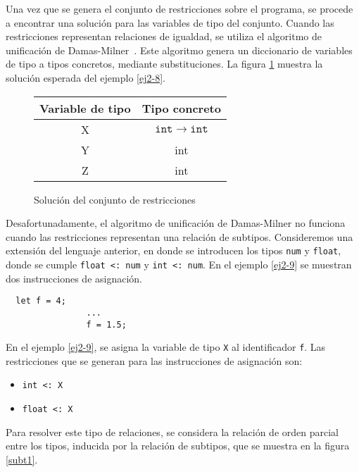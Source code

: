 Una vez que se genera el conjunto de restricciones sobre el programa, se procede a encontrar una solución para las variables de tipo del conjunto. Cuando las restricciones representan relaciones de igualdad, se utiliza el algoritmo de unificación de Damas-Milner~\cite{damasmilner}. Este algoritmo genera un diccionario de variables de tipo a tipos concretos, mediante substituciones. La figura \ref{tabla2} muestra la solución esperada del ejemplo \ref{ej2-8}.

\begin{figure}[ht]
  \centering
  \ttfamily
  \begin{tabular}{c c}
    Variable de tipo & Tipo concreto \\
    \hline
    X & $\mathtt{int \rightarrow int}$  \\
    Y & int \\
    Z & int \\
  \end{tabular}
  \caption{Solución del conjunto de restricciones}
  \label{tabla2}
\end{figure}

\clearpage
Desafortunadamente, el algoritmo de unificación de Damas-Milner no funciona cuando las restricciones representan una relación de subtipos. Consideremos una extensión del lenguaje anterior,  en donde se introducen los tipos \texttt{num} y \texttt{float}, donde se cumple \texttt{float <: num} y \texttt{int <: num}. En el ejemplo \ref{ej2-9} se muestran dos instrucciones de asignación.
\vspace{0.8em}
\begin{ej}
  \normalfont
  \label{ej2-9}
\begin{lstlisting}
  let f = 4;
                ...
                f = 1.5;
\end{lstlisting}
\end{ej}

En el ejemplo \ref{ej2-9}, se asigna la variable de tipo \texttt{X} al identificador \texttt{f}. Las restricciones que se generan para las instrucciones de asignación son:

\begin{itemize}
  \item \texttt{int <: X}
  \item \texttt{float <: X}
\end{itemize}


Para resolver este tipo de relaciones, se considera la relación de orden parcial entre los tipos, inducida por la relación de subtipos, que se muestra en la figura \ref{subt1}.


